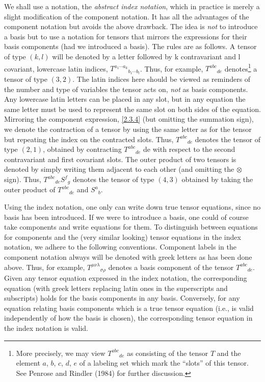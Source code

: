 We shall use a notation, the \emph{abstract index notation}, which in practice is merely a slight modification of the component notation. It has all the advantages of the component notation but avoids the above drawback. The idea is \emph{not} to introduce a basis but to use a notation for tensors that mirrors the expressions for their basis components (had we introduced a basis). The rules are as follows. A tensor of type $(k, l)$ will be denoted by a letter followed by k contravariant and l covariant, lowercase latin indices, ${T^{a_1\cdots a_k}}_{b_1\cdots b_l}$. Thus, for example, ${T^{abc}}_{de}$ denotes\footnote{More precisely, we may view ${T^{abc}}_{de}$ as consisting of the tensor $T$ and the element $a$, $b$, $c$, $d$, $e$ of a labeling set which mark the ``slots'' of this tensor. See Penrose and Rindler (1984) for further discussion.} a tensor of type $(3,2)$. The latin indices here should be viewed as reminders of the number and type of variables the tensor acts on, \emph{not} as basis components. Any lowercase latin letters can be placed in any slot, but in any equation the same letter must be used to represent the same slot on both sides of the equation. Mirroring the component expression, \eqref{2.3.4} (but omitting the summation sign), we denote the contraction of a tensor by using the same letter as for the tensor but repeating the index on the contracted slots. Thus, ${T^{abc}}_{de}$ denotes the tensor of type $(2,1)$, obtained by contracting ${T^{abc}}_{de}$ de with respect to the second contravariant and first covariant slots. The outer product of two tensors is denoted by simply writing them adjacent to each other (and omitting the $\otimes$ sign). Thus, ${T^{abc}}_{de}{S^f}_g$ denotes the tensor of type $(4,3)$ obtained by taking the outer product of ${T^{abc}}_{de}$ and ${S^a}_b$.

Using the index notation, one only can write down true tensor equations, since no basis has been introduced. If we were to introduce a basis, one could of course take components and write equations for them. To distinguish between equations for components and the (very similar looking) tensor equations in the index notation, we adhere to the following conventions. Component labels in the component notation always will be denoted with greek letters as has been done above. Thus, for example, ${T^{\mu\nu\lambda}}_{\sigma\rho}$ denotes a basis component of the tensor ${T^{abc}}_{de}$. Given any tensor equation expressed in the index notation, the corresponding equation (with greek letters replacing latin ones in the superscripts and subscripts) holds for the basis components in any basis. Conversely, for any equation relating basis components which is a true tensor equation (i.e., is valid independently of how the basis is chosen), the corresponding tensor equation in the index notation is valid.

